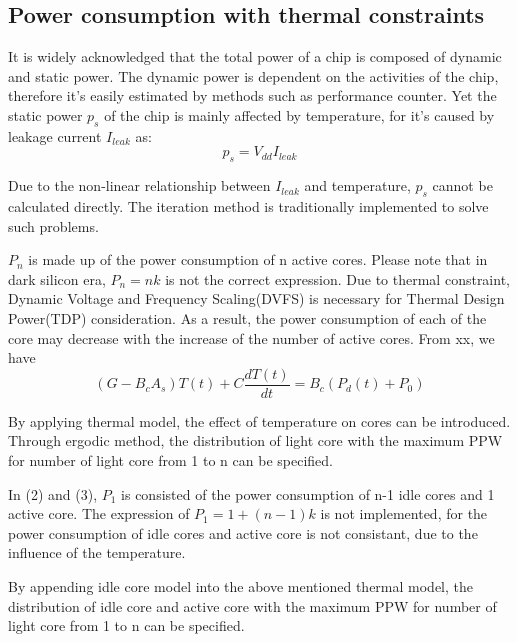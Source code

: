 \subsection{Power consumption with thermal constraints}

It is widely acknowledged that the total power of a chip is composed of dynamic and static power. The dynamic power is dependent on the activities of the chip, therefore it's easily estimated by methods such as performance counter. Yet the static power $p_{s}$ of the chip is mainly affected by temperature, for it's caused by leakage current $I_{leak}$ as:
\begin{equation}\label{ps}
p_{s} = V_{dd}I_{leak}
\end{equation}

Due to the non-linear relationship between $I_{leak}$ and temperature, $p_{s}$ cannot be
calculated directly. The iteration method is traditionally implemented to solve such problems.

$P_{n}$ is made up of the power consumption of n active cores. Please note that in dark silicon
era, $P_{n} = nk$ is not the correct expression. Due to thermal constraint, Dynamic Voltage and
Frequency Scaling(DVFS) is necessary for Thermal Design Power(TDP) consideration. As a result,
the power consumption of each of the core may decrease with the increase of the number of active cores.
From xx, we have
\begin{equation}\label{gt=bp}
(G - B_{c}A_{s})T(t) + C\frac{dT(t)}{dt}= B_{c}(P_{d}(t) + P_{0})
\end{equation}

By applying thermal model, the effect of temperature on cores can be introduced. 
Through ergodic method, the distribution of light core with the maximum PPW
for number of light core from 1 to n can be specified.

In (2) and (3), $P_{1}$ is consisted of the power consumption of n-1 idle cores and 1 active 
core. The expression of $P_{1} = 1+(n-1)k$ is not implemented, for the power consumption of 
idle cores and active core is not consistant, due to the influence of the temperature.

By appending idle core model into the above mentioned thermal model, the distribution of idle
core and active core with the maximum PPW for number of light core from 1 to n can be specified.